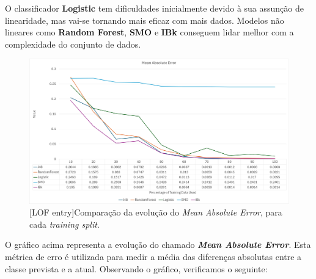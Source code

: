 \documentclass{easychair}
\begin{document}
O classificador \textbf{Logistic} tem dificuldades inicialmente devido à sua assunção de linearidade, mas vai-se tornando mais eficaz com mais dados. Modelos não lineares como \textbf{Random Forest}, \textbf{SMO} e \textbf{IBk} conseguem lidar melhor com a complexidade do conjunto de dados.

\begin{figure}[H]
    \begin{centering}
    \includegraphics[width=0.9\linewidth]{imagens/figure34.jpg}\label{cap-5-fig34}
    [LOF entry]{Comparação da evolução do \textit{Mean Absolute Error}, para cada \textit{training split}.}
    \label{fig34}
    \end{centering}
\end{figure}

O gráfico acima representa a evolução do chamado \textit{\textbf{Mean Absolute Error}}. Esta métrica de erro é utilizada para medir a média das diferenças absolutas entre a classe prevista e a atual. Observando o gráfico, verificamos o seguinte:
\end{document}
